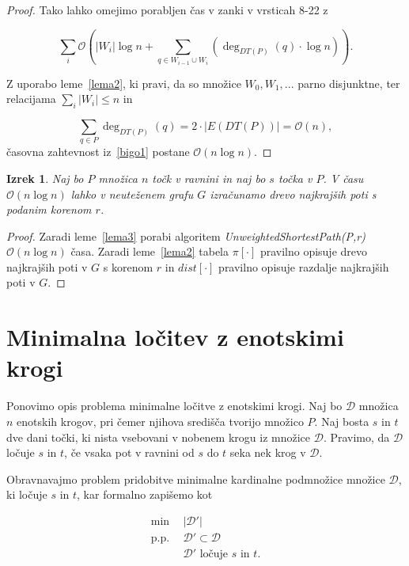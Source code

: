 \documentclass[a4paper, 12pt]{book}
\newcommand{\D}{\ensuremath{\mathcal{D}}}
\newcommand{\OO}{\ensuremath{\mathcal{O}}} %
\newtheorem{izrek}{Izrek}[chapter]
\begin{document}
\begin{proof}
Tako lahko omejimo porabljen čas v zanki v vrsticah 8-22 z

\begin{equation}
\label{bigo1}
\sum_i \OO \left( |W_i|\log n + \sum_{q\in W_{i-1}\cup W_i} (\deg_{DT(P)}(q) \cdot \log n) \right) .
\end{equation}

Z uporabo leme~\ref{lema2}, ki pravi, da so množice $W_0,W_1,...$ parno disjunktne, ter relacijama $\sum_i |W_i| \leq n$ in 

\begin{equation*}
\sum_{q \in P} \deg_{DT(P)}(q) = 2 \cdot |E(DT(P))| = \OO(n),
\end{equation*}
časovna zahtevnost iz~\ref{bigo1} postane $\OO(n\log n)$.
\end{proof}

\begin{izrek}
Naj bo $P$ množica $n$ točk v ravnini in naj bo $s$ točka v $P$. V času $\OO(n\log n)$ lahko v neuteženem grafu $G$ izračunamo drevo najkrajših poti s podanim korenom $r$.
\end{izrek}

\begin{proof}
Zaradi leme~\ref{lema3} porabi algoritem \textit{UnweightedShortestPath(P,r)} $\OO(n\log n)$ časa. Zaradi leme~\ref{lema2} tabela $\pi[\cdot]$ pravilno opisuje drevo najkrajših poti v $G$ s korenom $r$ in $dist[\cdot]$ pravilno opisuje razdalje najkrajših poti v $G$.
\end{proof}
\afterpage{\FloatBarrier}

\section{Minimalna ločitev z enotskimi krogi}
Ponovimo opis problema minimalne ločitve z enotskimi krogi.
Naj bo $\D$ množica $n$ enotskih krogov, pri čemer njihova središča tvorijo množico $P$. Naj bosta $s$ in $t$ dve dani točki, ki nista vsebovani v nobenem krogu iz množice $\D$. Pravimo, da $\D$ ločuje $s$ in $t$, če vsaka pot v ravnini od $s$ do $t$ seka nek krog v $\D$.

Obravnavajmo problem pridobitve minimalne kardinalne podmnožice mno\-ži\-ce $\D$, ki ločuje $s$ in $t$, kar formalno zapišemo kot 

\begin{align*}
	\min ~~		& |\D'|\\
	 \mbox{p.p.}~~ & \D'\subset \D\\
				&	\D'\text{ ločuje $s$ in $t$}. 
\end{align*}
\end{document}
